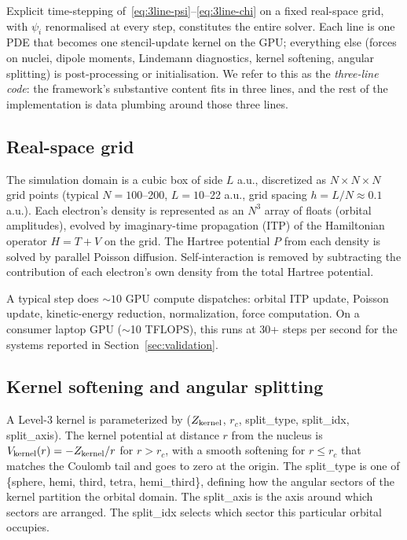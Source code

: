 \documentclass[11pt]{article}
\begin{document}
Explicit time-stepping of~\eqref{eq:3line-psi}--\eqref{eq:3line-chi} on a fixed real-space grid, with $\psi_i$ renormalised at every step, constitutes the entire solver. Each line is one PDE that becomes one stencil-update kernel on the GPU; everything else (forces on nuclei, dipole moments, Lindemann diagnostics, kernel softening, angular splitting) is post-processing or initialisation. We refer to this as the \emph{three-line code}: the framework's substantive content fits in three lines, and the rest of the implementation is data plumbing around those three lines.

\subsection{Real-space grid}

The simulation domain is a cubic box of side $L$ a.u., discretized as $N \times N \times N$ grid points (typical $N = 100$--200, $L = 10$--22 a.u., grid spacing $h = L/N \approx 0.1$ a.u.). Each electron's density is represented as an $N^3$ array of floats (orbital amplitudes), evolved by imaginary-time propagation (ITP) of the Hamiltonian operator $H = T + V$ on the grid. The Hartree potential $P$ from each density is solved by parallel Poisson diffusion. Self-interaction is removed by subtracting the contribution of each electron's own density from the total Hartree potential.

A typical step does ${\sim}10$ GPU compute dispatches: orbital ITP update, Poisson update, kinetic-energy reduction, normalization, force computation. On a consumer laptop GPU ($\sim$10 TFLOPS), this runs at 30+ steps per second for the systems reported in Section~\ref{sec:validation}.

\subsection{Kernel softening and angular splitting}

A Level-3 kernel is parameterized by ($Z_{\rm kernel}$, $r_c$, split\_type, split\_idx, split\_axis). The kernel potential at distance $r$ from the nucleus is $V_{\rm kernel}(r) = -Z_{\rm kernel}/r$ for $r > r_c$, with a smooth softening for $r \leq r_c$ that matches the Coulomb tail and goes to zero at the origin. The split\_type is one of \{sphere, hemi, third, tetra, hemi\_third\}, defining how the angular sectors of the kernel partition the orbital domain. The split\_axis is the axis around which sectors are arranged. The split\_idx selects which sector this particular orbital occupies.
\end{document}
